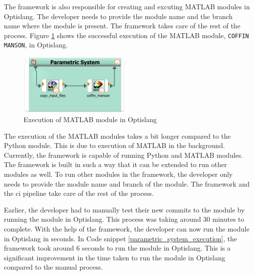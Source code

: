 The framework is also responsible for creating and excuting MATLAB modules in Optislang. The developer needs to provide the module name and the branch 
name where the module is present. The framework takes care of the rest of the process. Figure \ref{parametric_system_coffin_manson} shows the successful execution of the MATLAB module, 
\texttt{COFFIN MANSON}, in Optislang. 
\newpage
\begin{figure}[!ht]
    \centering
    \includegraphics[width=0.5\textwidth]{Images/parametric_system_coffin_manson.png}
    \caption{Execution of MATLAB module in Optislang}
    \label{parametric_system_coffin_manson}
\end{figure}

The execution of the MATLAB modules takes a bit longer compared to the Python module. This is due to execution of MATLAB in the background. 
Currently, the framework is capable of running Python and MATLAB modules. The framework is built in such a way that it can be extended to run other 
modules as well. To run other modules in the framework, the developer only needs to provide the module name and branch of the module. The framework and the 
\acrshort{ci} pipeline take care of the rest of the process.

Earlier, the developer had to manually test their new commits to the module by running the module in Optislang. This process was taking around 30 minutes to 
complete. With the help of the framework, the developer can now run the module in Optislang in seconds. In Code snippet \ref{parametric_system_execution}, the 
framework took around 6 seconds to run the module in Optislang. This is a significant improvement in the time taken to run the module in Optislang compared to the 
manual process. 